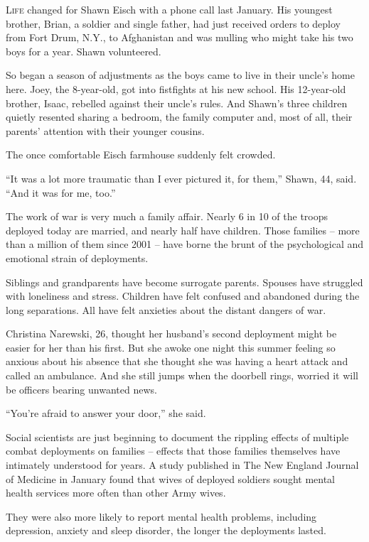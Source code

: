 ﻿\documentclass[12pt]{article}
\begin{document}
\lettrine{L}{ife} changed for Shawn Eisch with a phone call last January.
His youngest brother, Brian, a soldier and single father, had just received orders to deploy from
Fort Drum, N.Y., to Afghanistan and was mulling who might take his two boys for a year. Shawn
volunteered.

So began a season of adjustments as the boys came to live in their uncle's home here. Joey, the
8-year-old, got into fistfights at his new school. His 12-year-old brother, Isaac, rebelled against
their uncle's rules. And Shawn's three children quietly resented sharing a bedroom, the family
computer and, most of all, their parents' attention with their younger cousins.

The once comfortable Eisch farmhouse suddenly felt crowded.

``It was a lot more traumatic than I ever pictured it, for them,'' Shawn, 44, said. ``And it was for
me, too.''

The work of war is very much a family affair. Nearly 6 in 10 of the troops deployed today are
married, and nearly half have children. Those families -- more than a million of them since 2001 --
have borne the brunt of the psychological and emotional strain of deployments.

Siblings and grandparents have become surrogate parents. Spouses have struggled with loneliness and
stress. Children have felt confused and abandoned during the long separations. All have felt
anxieties about the distant dangers of war.

Christina Narewski, 26, thought her husband's second deployment might be easier for her than his
first. But she awoke one night this summer feeling so anxious about his absence that she thought she
was having a heart attack and called an ambulance. And she still jumps when the doorbell rings,
worried it will be officers bearing unwanted news.

``You're afraid to answer your door,'' she said.

Social scientists are just beginning to document the rippling effects of multiple combat deployments
on families -- effects that those families themselves have intimately understood for years. A study
published in The New England Journal of Medicine in January found that wives of deployed soldiers
sought mental health services more often than other Army wives.

They were also more likely to report mental health problems, including depression, anxiety and sleep
disorder, the longer the deployments lasted.
\end{document}
